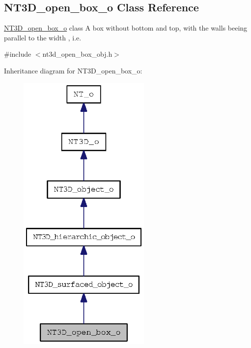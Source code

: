 \subsection{NT3D\_\-open\_\-box\_\-o Class Reference}
\label{class_n_t3_d__open__box__o}


\hyperlink{class_n_t3_d__open__box__o}{NT3D\_\-open\_\-box\_\-o} class A box without bottom and top, with the walls beeing parallel to the width , i.e.  




{\ttfamily \#include $<$nt3d\_\-open\_\-box\_\-obj.h$>$}



Inheritance diagram for NT3D\_\-open\_\-box\_\-o:
\nopagebreak
\begin{figure}[H]
\begin{center}
\leavevmode
\includegraphics[width=184pt]{class_n_t3_d__open__box__o__inherit__graph}
\end{center}
\end{figure}


